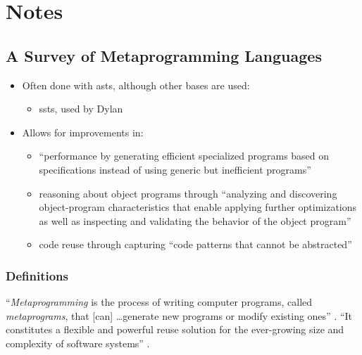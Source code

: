 \chapter{Notes}
\label{chap:notes}

\section{A Survey of Metaprogramming Languages}
\label{chap:notes:sec:metalang-survey}

\begin{itemize}
      \item Often done with \acfp{ast}, 
            although other bases are used:
            \begin{itemize}
                  \item \acfp{sst}, used by Dylan
                        \citep[p.~113:6]{lilis_survey_2019}
            \end{itemize}
      \item Allows for improvements in:
            \begin{itemize}
                  \item ``performance by generating efficient specialized
                        programs based on specifications instead of using
                        generic but inefficient programs''
                        \citep[p.~113:2]{lilis_survey_2019}
                  \item reasoning about object programs through ``analyzing
                        and discovering object-program characteristics that
                        enable applying further optimizations as well as
                        inspecting and validating the behavior of the object
                        program'' \citep[p.~113:2]{lilis_survey_2019}
                  \item code reuse through capturing ``code patterns that cannot
                        be abstracted'' \citep[p.~113:2]{lilis_survey_2019}
            \end{itemize}
\end{itemize}

\subsection{Definitions}

``\emph{Metaprogramming} is the process of writing computer programs, called
\emph{metaprograms}, that [can] \dots generate new programs or modify existing
ones'' \citep[p.~113:1]{lilis_survey_2019}. ``It constitutes a flexible and
powerful reuse solution for the ever-growing size and complexity of software
systems'' \citep[p.~113:31]{lilis_survey_2019}.

